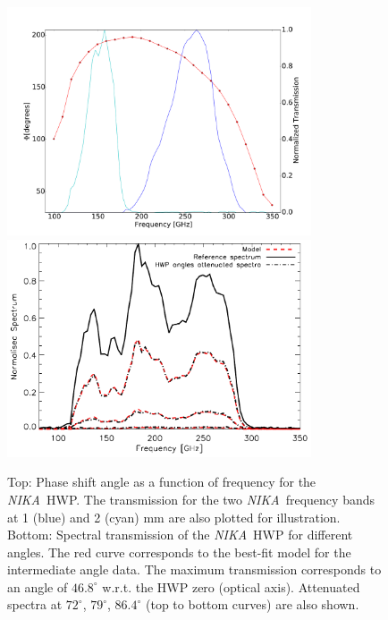 \documentclass[twocolumn, traditabstract]{aa}
\newcommand{\nika}{{\it NIKA}}
\begin{document}
\begin{figure}[t!]
  \begin{center}
   \includegraphics[width=9cm, keepaspectratio]{phase_shift_angle.pdf}
   \includegraphics[width=9cm, keepaspectratio]{spectre.pdf}
    \caption{Top: Phase shift angle as a function of frequency for the \nika\ HWP. The transmission for the two \nika\ frequency bands
    at 1 (blue) and 2 (cyan) mm are also plotted for illustration. Bottom: 
    Spectral transmission of the \nika\ HWP for different angles. 
    The red curve corresponds to the best-fit model for the intermediate angle data. The maximum transmission
    corresponds to an angle of $46.8^{\circ}$ w.r.t. the HWP zero (optical axis). Attenuated spectra at $72^{\circ}$, $79^{\circ}$, $86.4^{\circ}$
     (top to bottom curves) are also shown.}
        \label{fig:spectre}
  \end{center}
\end{figure}
\end{document}
